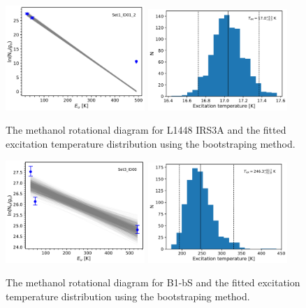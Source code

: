 \documentclass[twocolumn]{aastex62}
\begin{document}
\begin{figure}[htbp!]
  \centering
  \includegraphics[width=0.47\textwidth]{Set1_ID01_2.pdf}
  \includegraphics[width=0.47\textwidth]{Set1_ID01_2_rot_temps.pdf}
  \caption{The methanol rotational diagram for L1448 IRS3A and the fitted excitation temperature distribution using the bootstraping method.}
  \label{}
\end{figure}

\begin{figure}[htbp!]
  \centering
  \includegraphics[width=0.47\textwidth]{Set3_ID00.pdf}
  \includegraphics[width=0.47\textwidth]{Set3_ID00_rot_temps.pdf}
  \caption{The methanol rotational diagram for B1-bS and the fitted excitation temperature distribution using the bootstraping method.}
  \label{}
\end{figure}
\end{document}
